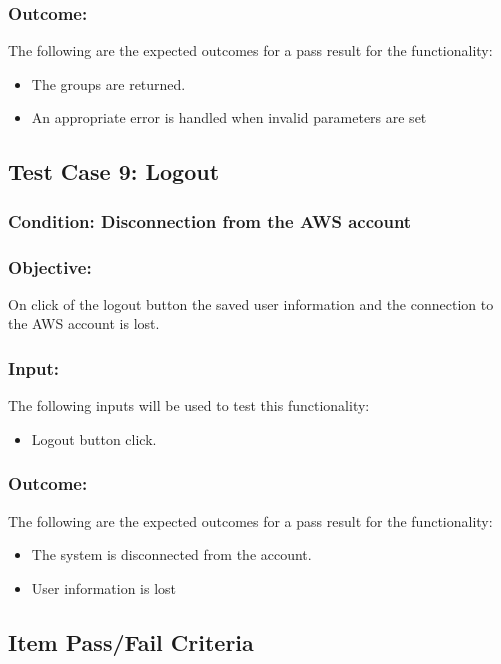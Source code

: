 \documentclass[hidelinks,a4paper,12pt]{article}
\begin{document}
\subsubsection{Outcome: }
The following are the expected outcomes for a pass result for the functionality:
\begin{itemize}
	\item The groups are returned.
	\item An appropriate error is handled when invalid parameters are set
	
\end{itemize}

\subsection{Test Case 9: Logout }
\subsubsection{Condition: Disconnection from the AWS account}
\subsubsection{Objective:} On click of the logout button the saved user information and the connection to the AWS account is lost. 

\subsubsection{Input:}
The following inputs will be used to test this functionality:
\begin{itemize}
	\item Logout button click.
	
	
\end{itemize}

\subsubsection{Outcome: }
The following are the expected outcomes for a pass result for the functionality:
\begin{itemize}
	\item The system is disconnected from the account.
	\item User information is lost
	
\end{itemize}

\subsection{Item Pass/Fail Criteria}
\end{document}
